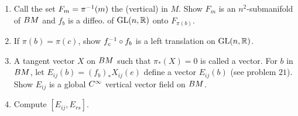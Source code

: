 \documentclass[../main]{subfiles}
\begin{document}
\begin{enumerate}
\begin{enumerate}[label=(\roman{enumii})]
    \item Call the set $F_m = \pi^{-1}(m)$ the (vertical)  in $M$. Show $F_m$ is an $n^2$-submanifold of $BM$ and $f_b$ is a diffeo. of $\mathrm{GL}(n, \mathbb{R})$ onto $F_{\pi(b)}$. 
    \item If $\pi(b) = \pi(c)$, show $f_c ^{-1} \circ f_b$ is a left translation on $\mathrm{GL}(n,\mathbb{R})$.
    \item A tangent vector $X$ on $BM$ such that $\pi_*(X) = 0$ is called a  vector. For $b$ in $BM$, let $E_{i  j} (b) = (f_b)_* X_{i  j}(e)$ define a vector $E_{i  j} (b)$ (see problem $21$). Show $E_{i  j}$ is a global $C^\infty$ vertical vector field on $BM$.
    \item Compute $[E_{i  j}, E_{r  s}]$.
\end{enumerate}

\end{enumerate}
\end{document}
